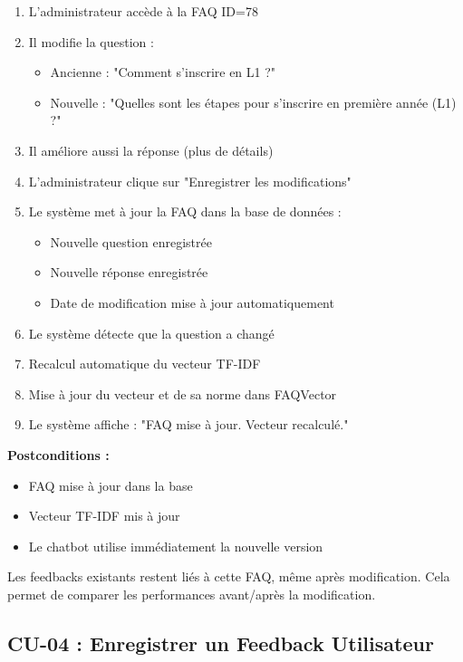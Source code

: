 \documentclass[11pt,a4paper]{article}
\begin{document}
\begin{enumerate}
    \item L'administrateur accède à la FAQ ID=78
    \item Il modifie la question :
    \begin{itemize}
        \item Ancienne : "Comment s'inscrire en L1 ?"
        \item Nouvelle : "Quelles sont les étapes pour s'inscrire en première année (L1) ?"
    \end{itemize}
    \item Il améliore aussi la réponse (plus de détails)
    \item L'administrateur clique sur "Enregistrer les modifications"
    \item Le système met à jour la FAQ dans la base de données :
    \begin{itemize}
        \item Nouvelle question enregistrée
        \item Nouvelle réponse enregistrée
        \item Date de modification mise à jour automatiquement
    \end{itemize}
    \item Le système détecte que la question a changé
    \item Recalcul automatique du vecteur TF-IDF
    \item Mise à jour du vecteur et de sa norme dans FAQVector
    \item Le système affiche : "FAQ mise à jour. Vecteur recalculé."
\end{enumerate}

\textbf{Postconditions :}
\begin{itemize}
    \item FAQ mise à jour dans la base
    \item Vecteur TF-IDF mis à jour
    \item Le chatbot utilise immédiatement la nouvelle version
\end{itemize}

\begin{important}
Les feedbacks existants restent liés à cette FAQ, même après modification. Cela permet de comparer les performances avant/après la modification.
\end{important}

\clearpage

\subsection{CU-04 : Enregistrer un Feedback Utilisateur}
\end{document}
